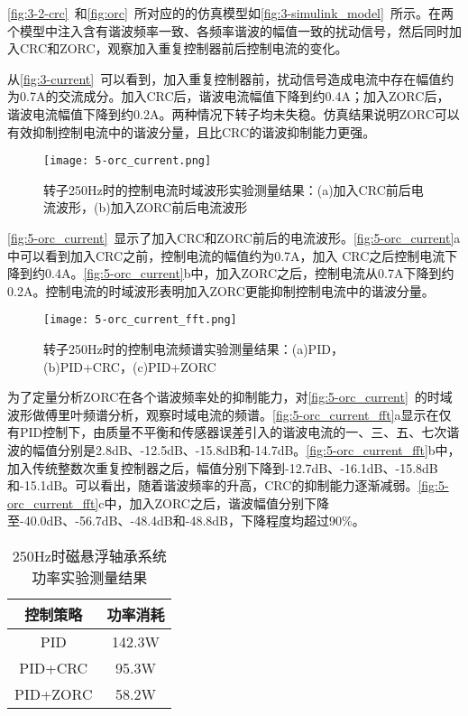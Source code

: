 \documentclass[
  lang=cn,
  degree=master,
  openany,oneside
]{nuaathesis}
\begin{document}
\autoref{fig:3-2-crc}~和\autoref{fig:orc}~所对应的的仿真模型如\autoref{fig:3-simulink_model}~所示。在两个模型中注入含有谐波频率一致、各频率谐波的幅值一致的扰动信号，然后同时加入CRC和ZORC，观察加入重复控制器前后控制电流的变化。

从\autoref{fig:3-current}~可以看到，加入重复控制器前，扰动信号造成电流中存在幅值约为0.7A的交流成分。加入CRC后，谐波电流幅值下降到约0.4A；加入ZORC后，谐波电流幅值下降到约0.2A。两种情况下转子均未失稳。仿真结果说明ZORC可以有效抑制控制电流中的谐波分量，且比CRC的谐波抑制能力更强。

\begin{figure}[h!]
	\texttt{[image: 5-orc\_current.png]}
	\caption{转子250Hz时的控制电流时域波形实验测量结果：(a)加入CRC前后电流波形，(b)加入ZORC前后电流波形}
	\label{fig:5-orc_current}
\end{figure}

\autoref{fig:5-orc_current}~显示了加入CRC和ZORC前后的电流波形。\autoref{fig:5-orc_current}a中可以看到加入CRC之前，控制电流的幅值约为0.7A，加入
CRC之后控制电流下降到约0.4A。\autoref{fig:5-orc_current}b中，加入ZORC之后，控制电流从0.7A下降到约0.2A。控制电流的时域波形表明加入ZORC更能抑制控制电流中的谐波分量。

\begin{figure}[h!]
	\texttt{[image: 5-orc\_current\_fft.png]}
	\caption{转子250Hz时的控制电流频谱实验测量结果：(a)PID，(b)PID+CRC，(c)PID+ZORC}
	\label{fig:5-orc_current_fft}
\end{figure}

为了定量分析ZORC在各个谐波频率处的抑制能力，对\autoref{fig:5-orc_current}~的时域波形做傅里叶频谱分析，观察时域电流的频谱。\autoref{fig:5-orc_current_fft}a显示在仅有PID控制下，由质量不平衡和传感器误差引入的谐波电流的一、三、五、七次谐波的幅值分别是2.8dB、-12.5dB、-15.8dB和-14.7dB。\autoref{fig:5-orc_current_fft}b中，加入传统整数次重复控制器之后，幅值分别下降到-12.7dB、-16.1dB、-15.8dB和-15.1dB。可以看出，随着谐波频率的升高，CRC的抑制能力逐渐减弱。\autoref{fig:5-orc_current_fft}c中，加入ZORC之后，谐波幅值分别下降至-40.0dB、-56.7dB、-48.4dB和-48.8dB，下降程度均超过90\%。

\begin{table}[htb]
  \caption[250Hz时磁悬浮轴承系统功率实验测量结果]{250Hz时磁悬浮轴承系统功率实验测量结果\label{tab:amb_power}}
  \begin{tabular}{cc}
    \toprule
    控制策略 & 功率消耗 \\
    \midrule
    PID & 142.3W\\
    PID+CRC & 95.3W\\
    PID+ZORC & 58.2W\\
    \bottomrule
  \end{tabular}
\end{table}
\end{document}
